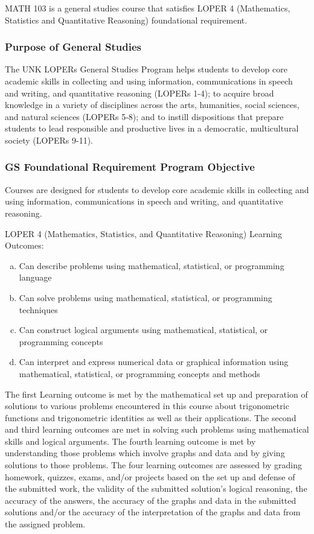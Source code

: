 \documentclass[12pt]{article}
\newcounter{ex}\setcounter{ex}{0}
\newenvironment{alphalist}{
  \begin{enumerate}[(a)]
    \addtolength{\itemsep}{-0.5\itemsep}}
  {\end{enumerate}}
\begin{document}
MATH 103 is a general studies course that satisfies LOPER 4 (Mathematics, Statistics and Quantitative Reasoning) foundational requirement. 

\subsubsection*{Purpose of General Studies} The UNK LOPERs General Studies Program helps students to develop core academic skills in collecting and using information, communications in speech and writing, and quantitative reasoning (LOPERs 1-4); to acquire broad knowledge in a variety of disciplines across the arts, humanities, social sciences, and natural sciences (LOPERs 5-8); and to instill dispositions that prepare students to lead responsible and productive lives in a democratic, multicultural society (LOPERs 9-11).

\subsubsection*{GS Foundational Requirement Program Objective} Courses 
are designed for students to develop core academic skills in 
collecting and using information, communications in speech and 
writing, and quantitative reasoning.

LOPER 4 (Mathematics, Statistics, and Quantitative Reasoning) Learning Outcomes: 
\begin{alphalist}
    \item  Can describe problems using mathematical, statistical, or programming language 
     \item Can solve problems using mathematical, statistical, or programming techniques 
    \item Can construct logical arguments using mathematical, statistical, or programming concepts 
     \item Can interpret and express numerical data or graphical information using mathematical, statistical, or programming concepts and methods
        \end{alphalist}

The first Learning outcome is met by the mathematical set up and 
preparation of solutions to various problems encountered in this 
course about trigonometric functions and trigonometric identities 
as well as their applications. The second and third learning 
outcomes are met in solving such problems using mathematical 
skills and logical arguments. The fourth learning outcome is met 
by understanding those problems which involve graphs and data and by 
giving solutions to those problems. The four learning outcomes are 
assessed by grading homework, quizzes, exams, and/or projects based 
on the set up and defense of the submitted work, the validity of the 
submitted solution’s logical reasoning, the accuracy of the answers, 
the accuracy of the graphs and data in the submitted solutions 
and/or the accuracy of the interpretation 
of the graphs and data from the assigned problem.
\end{document}
